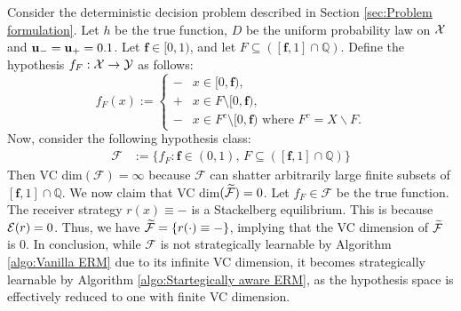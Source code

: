 \begin{exg}\label{exg:counter example}
Consider the deterministic decision problem described in Section \ref{sec:Problem formulation}. Let $h$ be the true function, $D$ be the uniform probability law on $\mathcal{X}$ and $\mathbf{u_-} = \mathbf{u_+} = 0.1$. Let $\mathbf{f} \in [0,1)$, and let $F \subseteq ([\mathbf{f},1] \cap \mathbb{Q})$. Define the hypothesis $f_F: \mathcal{X} \to \mathcal{Y}$ as follows:
\[
f_F(x) :=
\begin{cases}
    \minus & x \in [0, \mathbf{f}), \\
    \plus & x \in F \setminus [0, \mathbf{f}), \\
    \minus & x \in F^c \setminus [0, \mathbf{f}) \text{ where } F^c = X \backslash F.
\end{cases}
\]
Now, consider the following hypothesis class:
\[
\begin{aligned}
    \mathcal{F} &:= \{f_F : \mathbf{f} \in (0,1), \, F \subseteq ([\mathbf{f}, 1] \cap \mathbb{Q})\}
\end{aligned}
\]
Then VC dim$(\mathcal{F}) = \infty$ because $\mathcal{F}$ can shatter arbitrarily large finite subsets of $[\mathbf{f}, 1] \cap \mathbb{Q}$. We now claim that VC dim$(\widetilde{\mathcal{F}}) = 0$. Let $f_F \in \mathcal{F}$ be the true function. The receiver strategy $r(x) \equiv \minus$ is a Stackelberg equilibrium. This is because $\mathcal{E}(r) = 0$.
Thus, we have \( \widetilde{\mathcal{F}} = \{r(\cdot) \equiv \mathbf{-}\} \), implying that the VC dimension of \( \widetilde{\mathcal{F}} \) is $0$. In conclusion, while \( \mathcal{F} \) is not strategically learnable by Algorithm \ref{algo:Vanilla ERM} due to its infinite VC dimension, it becomes strategically learnable by Algorithm \ref{algo:Startegically aware ERM}, as the hypothesis space is effectively reduced to one with finite VC dimension.
\end{exg}
